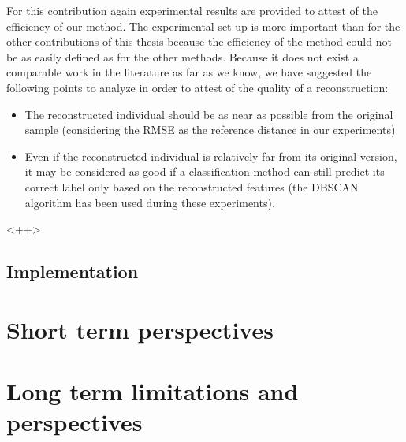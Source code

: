 For this contribution again experimental results are provided to attest of the efficiency of our method. The experimental set up is more important than for the other contributions of this thesis because the efficiency of the method could not be as easily defined as for the other methods. Because it does not exist a comparable work in the literature as far as we know, we have suggested the following points to analyze in order to attest of the quality of a reconstruction:
\begin{itemize}
    \item The reconstructed individual should be as near as possible from the original sample (considering the RMSE as the reference distance in our experiments)
    \item Even if the reconstructed individual is relatively far from its original version, it may be considered as good if a classification method can still predict its correct label only based on the reconstructed features (the DBSCAN algorithm has been used during these experiments).

\end{itemize}<++>



\subsection{Implementation}

\section{Short term perspectives}

\section{Long term limitations and perspectives}
